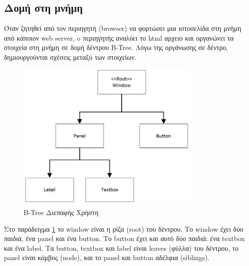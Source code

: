 \subsection{Δομή στη μνήμη}	
Όταν ζητηθεί από τον περιηγητή (browser) να φορτώσει μια ιστοσελίδα στη μνήμη από κάποιον web server, o περιηγητής αναλύει το html αρχειο και οργανώνει τα στοιχεία στη μνήμη σε δομή δέντρου \gls{B-Tree}. Λόγω της οργάνωσης σε δέντρο, δημιουργούνται σχέσεις μεταξύ των στοιχείων.

	\begin{figure}[h!]
		\centering
		\includegraphics[width=90mm]{Images/ui_btree}
		\caption{B-Tree Διεπαφής Χρήστη}
		\label{fig:ui_b-tree}
	\end{figure}
	
Στο παράδειγμα \ref{fig:ui_b-tree}  το window είναι η ρίζα (root) του δέντρου. Το window έχει δύο παιδιά, ένα panel και ένα button. Το button έχει και αυτό δύο παιδιά: ένα textbox και ένα label. Τα button, textbox και label είναι leaves (φύλλα) του δέντρου, το panel είναι κόμβος (node), και το panel και button αδέλφια (siblings).

